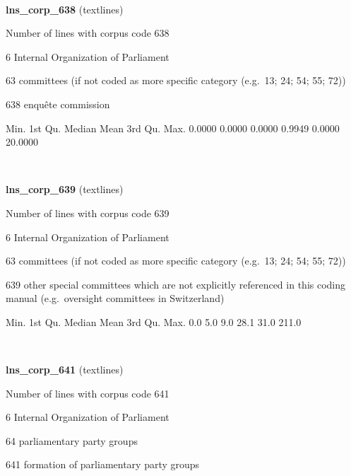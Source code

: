 \documentclass[]{article}
\newenvironment{Shaded}{\begin{snugshade}}{\end{snugshade}}
\newcommand{\FloatTok}[1]{\textcolor[rgb]{0.00,0.00,0.81}{{#1}}}
\newcommand{\NormalTok}[1]{{#1}}
\begin{document}
~

\vspace{1em}

\textbf{lns\_corp\_638} (textlines)

Number of lines with corpus code 638

6 Internal Organization of Parliament

63 committees (if not coded as more specific category (e.g.~13; 24; 54;
55; 72))

638 enquête commission

\begin{Shaded}
\begin{Highlighting}[]
   \NormalTok{Min. 1st Qu.  Median    Mean 3rd Qu.    Max. }
 \FloatTok{0.0000}  \FloatTok{0.0000}  \FloatTok{0.0000}  \FloatTok{0.9949}  \FloatTok{0.0000} \FloatTok{20.0000} 
\end{Highlighting}
\end{Shaded}

~

\vspace{1em}

\textbf{lns\_corp\_639} (textlines)

Number of lines with corpus code 639

6 Internal Organization of Parliament

63 committees (if not coded as more specific category (e.g.~13; 24; 54;
55; 72))

639 other special committees which are not explicitly referenced in this
coding manual (e.g.~oversight committees in Switzerland)

\begin{Shaded}
\begin{Highlighting}[]
   \NormalTok{Min. 1st Qu.  Median    Mean 3rd Qu.    Max. }
    \FloatTok{0.0}     \FloatTok{5.0}     \FloatTok{9.0}    \FloatTok{28.1}    \FloatTok{31.0}   \FloatTok{211.0} 
\end{Highlighting}
\end{Shaded}

~

\vspace{1em}

\textbf{lns\_corp\_641} (textlines)

Number of lines with corpus code 641

6 Internal Organization of Parliament

64 parliamentary party groups

641 formation of parliamentary party groups
\end{document}
